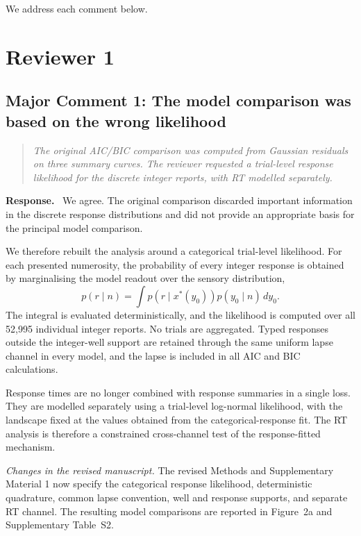 \documentclass[11pt]{article}
\newenvironment{reviewercomment}{\begin{quote}\color{reviewgray}\itshape}{\end{quote}}
\newenvironment{authorresponse}{\par\noindent\textbf{\color{responseblue}Response.}\ }{\par}
\newcommand{\change}[1]{\par\noindent\textit{Changes in the revised manuscript.} #1\par}
\begin{document}
We address each comment below.

\section*{Reviewer 1}

\subsection*{Major Comment 1: The model comparison was based on the wrong likelihood}

\begin{reviewercomment}
The original AIC/BIC comparison was computed from Gaussian residuals on three summary curves. The reviewer requested a trial-level response likelihood for the discrete integer reports, with RT modelled separately.
\end{reviewercomment}

\begin{authorresponse}
We agree. The original comparison discarded important information in the discrete response distributions and did not provide an appropriate basis for the principal model comparison.

We therefore rebuilt the analysis around a categorical trial-level likelihood. For each presented numerosity, the probability of every integer response is obtained by marginalising the model readout over the sensory distribution,
\[
p(r\mid n)=\int p\!\left(r\mid x^*(y_0)\right)p(y_0\mid n)\,dy_0.
\]
The integral is evaluated deterministically, and the likelihood is computed over all 52,995 individual integer reports. No trials are aggregated. Typed responses outside the integer-well support are retained through the same uniform lapse channel in every model, and the lapse is included in all AIC and BIC calculations.

Response times are no longer combined with response summaries in a single loss. They are modelled separately using a trial-level log-normal likelihood, with the landscape fixed at the values obtained from the categorical-response fit. The RT analysis is therefore a constrained cross-channel test of the response-fitted mechanism.
\end{authorresponse}

\change{The revised Methods and Supplementary Material 1 now specify the categorical response likelihood, deterministic quadrature, common lapse convention, well and response supports, and separate RT channel. The resulting model comparisons are reported in Figure~2a and Supplementary Table~S2.}
\end{document}
